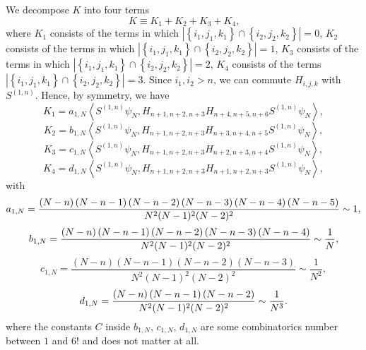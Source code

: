 \documentclass[12pt,letterpaper,leqno]{amsart}
\theoremstyle{plain}
\numberwithin{equation}{section}
\numberwithin{theorem}{section}
\numberwithin{proposition}{section}
\numberwithin{lemma}{section}
\numberwithin{corollary}{section}
\begin{document}
We decompose $K$ into four terms 
\begin{equation*}
K\equiv K_{1}+K_{2}+K_{3}+K_{4}\text{,}
\end{equation*}%
where $K_{1}$ consists of the terms in which $\left\vert \left\{
i_{1},j_{1},k_{1}\right\} \cap \left\{ i_{2},j_{2},k_{2}\right\} \right\vert
=0$, $K_{2}$ consists of the terms in which $\left\vert \left\{
i_{1},j_{1},k_{1}\right\} \cap \left\{ i_{2},j_{2},k_{2}\right\} \right\vert
=1$, $K_{3}$ consists of the terms in which $\left\vert \left\{
i_{1},j_{1},k_{1}\right\} \cap \left\{ i_{2},j_{2},k_{2}\right\} \right\vert
=2$, $K_{4}$ consists of the terms $\left\vert \left\{
i_{1},j_{1},k_{1}\right\} \cap \left\{ i_{2},j_{2},k_{2}\right\} \right\vert
=3$. Since $i_{1},i_{2}>n$, we can commute $H_{i,j,k}$ with $S^{(1,n)}$.
Hence, by symmetry, we have%
\begin{equation*}
K_{1}=a_{1,N}\left\langle S^{(1,n)}\psi
_{N},H_{n+1,n+2,n+3}H_{n+4,n+5,n+6}S^{(1,n)}\psi _{N}\right\rangle ,
\end{equation*}%
\begin{equation*}
K_{2}=b_{1,N}\left\langle S^{(1,n)}\psi
_{N},H_{n+1,n+2,n+3}H_{n+3,n+4,n+5}S^{(1,n)}\psi _{N}\right\rangle ,
\end{equation*}%
\begin{equation*}
K_{3}=c_{1,N}\left\langle S^{(1,n)}\psi
_{N},H_{n+1,n+2,n+3}H_{n+2,n+3,n+4}S^{(1,n)}\psi _{N}\right\rangle ,
\end{equation*}%
\begin{equation*}
K_{4}=d_{1,N}\left\langle S^{(1,n)}\psi
_{N},H_{n+1,n+2,n+3}H_{n+1,n+2,n+3}S^{(1,n)}\psi _{N}\right\rangle ,
\end{equation*}%
with 
\begin{equation*}
a_{1,N}=\frac{\left( N-n\right) \left( N-n-1\right) \left( N-n-2\right)
\left( N-n-3\right) \left( N-n-4\right) \left( N-n-5\right) }{%
N^{2}(N-1)^{2}(N-2)^{2}}\sim 1,
\end{equation*}%
\begin{equation*}
b_{1,N}=\frac{\left( N-n\right) \left( N-n-1\right) \left( N-n-2\right)
\left( N-n-3\right) \left( N-n-4\right) }{N^{2}(N-1)^{2}(N-2)^{2}}\sim \frac{%
1}{N},
\end{equation*}%
\begin{equation*}
c_{1,N}=\frac{\left( N-n\right) \left( N-n-1\right) \left( N-n-2\right)
\left( N-n-3\right) }{N^{2}(N-1)^{2}(N-2)^{2}}\sim \frac{1}{N^{2}},
\end{equation*}%
\begin{equation*}
d_{1,N}=\frac{\left( N-n\right) \left( N-n-1\right) \left( N-n-2\right) }{%
N^{2}(N-1)^{2}(N-2)^{2}}\sim \frac{1}{N^{3}}.
\end{equation*}%
where the constants $C$ inside $b_{1,N}$, $c_{1,N}$, $d_{1,N}$ are some
combinatorics number between $1$ and $6!$ and does not matter at all.
\end{document}
